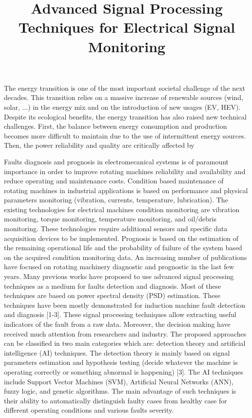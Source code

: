 \documentclass{article}
\begin{document}
\title{Advanced Signal Processing Techniques for Electrical Signal Monitoring}
   
 \maketitle  
 
The energy transition is one of the most important societal challenge of the next decades. This transition relies on a massive increase of renewable sources (wind, solar, ...) in the energy mix and on the introduction of new usages (EV, HEV). Despite its ecological benefits, the energy transition has also raised new technical challenges. First, the balance between energy consumption and production becomes more difficult to maintain due to the use of intermittent energy sources. Then, the power reliability and quality are critically affected by 


Faults diagnosis and prognosis in electromecanical systems is of paramount importance in order to improve rotating machines reliability and availability and reduce operating and maintenance costs. Condition based maintenance of rotating machines in industrial applications is based on performance and physical parameters monitoring (vibration, currents, temperature, lubrication). The existing technologies for electrical machines condition monitoring are vibration monitoring, torque monitoring, temperature monitoring, and oil/debris monitoring. These technologies require additional sensors and specific data acquisition devices to be implemented. Prognosis is based on the estimation of the remaining operational life and the probability of failure of the system based on the acquired condition monitoring data. An increasing number of publications have focused on rotating machinery diagnostic and prognostic in the last few years. Many previous works have proposed to use advanced signal processing techniques as a medium for faults detection and diagnosis. Most of these techniques are based on power spectral density (PSD) estimation.  These techniques have been mostly demonstrated for induction machine fault detection and diagnosis [1-3]. These signal processing techniques allow extracting useful indicators of the fault from a raw data. Moreover, the decision making have received much attention from researchers and industry. The proposed approaches can be classified in two main categories which are: detection theory and artificial intelligence (AI) techniques. The detection theory is mainly based on signal parameters estimation and hypothesis testing (decide whatever the machine is operating correctly or something abnormal is happening) [3]. The AI techniques include Support Vector Machines (SVM), Artificial Neural Networks (ANN), fuzzy logic, and genetic algorithms. The main advantage of such techniques is their ability to automatically distinguish faulty cases from healthy case for different operating conditions and various faults severity. 
\end{document}
